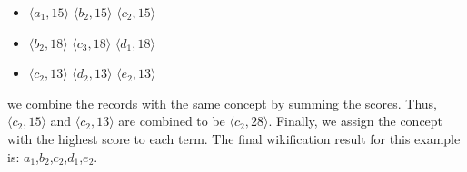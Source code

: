 \begin{itemize}
\item {$\langle a_1,15\rangle$ $\langle b_2,15\rangle$ $\langle c_2,15\rangle$}
\item {$\langle b_2,18\rangle$ $\langle c_3,18\rangle$ $\langle d_1,18\rangle$}
\item {$\langle c_2,13\rangle$ $\langle d_2,13\rangle$ $\langle e_2,13\rangle$}
\end{itemize}

we combine the records with the same concept by summing the scores.
Thus, $\langle c_2,15\rangle$ and $\langle c_2,13\rangle$
are combined to be $\langle c_2,28\rangle$.
Finally, we assign the concept with the highest score to each term.
The final wikification result for this example is: $a_1$,$b_2$,$c_2$,$d_1$,$e_2$.


